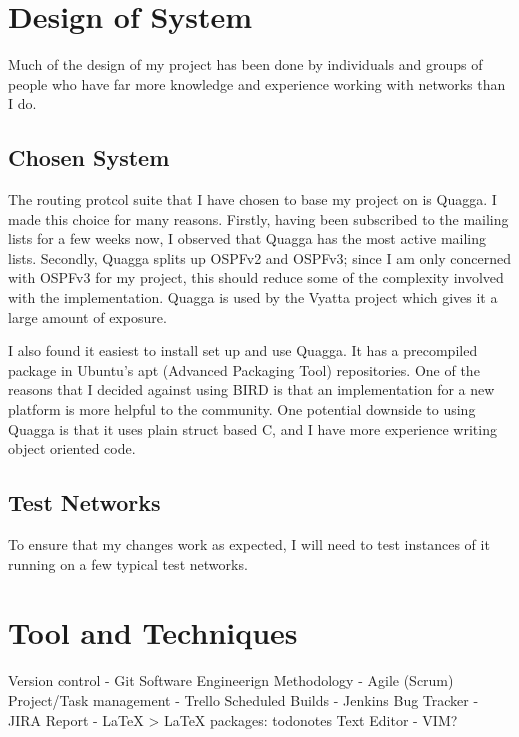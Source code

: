 \documentclass[12pt]{report}
\begin{document}
\chapter{Design of System}
Much of the design of my project has been done by individuals and groups of
people who have far more knowledge and experience working with networks than I
do. 

\section{Chosen System}
The routing protcol suite that I have chosen to base my project on is Quagga. I
made this choice for many reasons. Firstly, having been subscribed to the
mailing lists for a few weeks now, I observed that Quagga has the most active
mailing lists. Secondly, Quagga splits up OSPFv2 and OSPFv3; since I am only
concerned with OSPFv3 for my project, this should reduce some of the complexity
involved with the implementation. Quagga is used by the Vyatta project which
gives it a large amount of exposure. 

I also found it easiest to install set up and use Quagga. It has a precompiled
package in Ubuntu's apt (Advanced Packaging Tool) repositories. One of the
reasons that I decided against using BIRD is that an implementation for a new
platform is more helpful to the community. One potential downside to using
Quagga is that it uses plain struct based C, and I have more experience writing
object oriented code. 


\section{Test Networks}
To ensure that my changes work as expected, I will need to test instances of it
running on a few typical test networks. 


\chapter{Tool and Techniques}

Version control - Git
Software Engineerign Methodology - Agile (Scrum)
Project/Task management - Trello
Scheduled Builds - Jenkins 
Bug Tracker - JIRA 
Report - LaTeX
 > LaTeX packages: todonotes
Text Editor - VIM?
\end{document}
